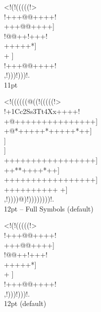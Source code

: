 \documentclass[10pt]{article}
\begin{document}
\begin{center}
\newpage

{
\gnos%
<!(!(((((!>\\
!+++@@++++!\\
+++@@++++]\\
!@@++!+++!\\
+++++*]\\
+
]\\
!+++@@++++!\\
,!)))!)))!.\\
}
11pt

{
\gnos%
<!((((((@((!(((((!>\\
!+1Cc2Ss3Tt4Xx++++!\\
+@+++++++++++++++]\\
+@*+++++*+++++*++]\\}
{\gnosb{}}{\gnos]\\}
{\gnosw{}}{\gnos]\\
+++++++++++++++++]\\
++*{\gnoswi{}}{\gnoswii{}}{\gnoswiii{}}{\gnosbi{}}{\gnosbii{}}{\gnosbiii{}}*++++*++]\\
+++++++++++++++++]\\
++++++++++
+]\\
,!))))@)!))))))))!.\\
}
12pt -- Full Symbols (default)

{
\gnos%
<!(!(((((!>\\
!+++@@++++!\\
+++@@++++]\\
!@@++!+++!\\
+++++*]\\
+
]\\
!+++@@++++!\\
,!)))!)))!.\\
}
12pt (default)


\end{center}
\end{document}
